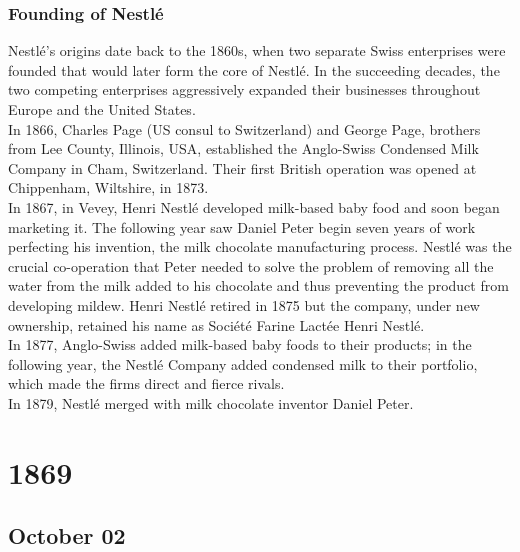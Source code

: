 \documentclass[11pt]{report}
\begin{document}
\subsection{Founding of Nestlé}
Nestlé's origins date back to the 1860s, when two separate Swiss enterprises were founded that would later form the core of Nestlé. In the succeeding decades, the two competing enterprises aggressively expanded their businesses throughout Europe and the United States.\\
\indent In 1866, Charles Page (US consul to Switzerland) and George Page, brothers from Lee County, Illinois, USA, established the Anglo-Swiss Condensed Milk Company in Cham, Switzerland. Their first British operation was opened at Chippenham, Wiltshire, in 1873.\\
\indent In 1867, in Vevey, Henri Nestlé developed milk-based baby food and soon began marketing it. The following year saw Daniel Peter begin seven years of work perfecting his invention, the milk chocolate manufacturing process. Nestlé was the crucial co-operation that Peter needed to solve the problem of removing all the water from the milk added to his chocolate and thus preventing the product from developing mildew. Henri Nestlé retired in 1875 but the company, under new ownership, retained his name as Société Farine Lactée Henri Nestlé.\\
\indent In 1877, Anglo-Swiss added milk-based baby foods to their products; in the following year, the Nestlé Company added condensed milk to their portfolio, which made the firms direct and fierce rivals.\\ \indent In 1879, Nestlé merged with milk chocolate inventor Daniel Peter.

\chapter{1869}
\section{October 02}
\end{document}
